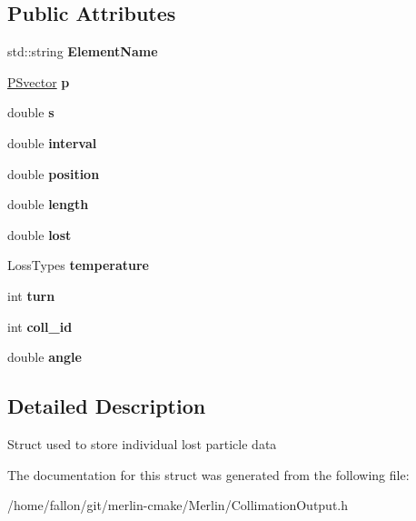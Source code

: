 \subsection*{Public Attributes}
\begin{DoxyCompactItemize}
\item 
\mbox{\label{structParticleTracking_1_1LossData_ae3ef721446c137cf63bd0322235d579b}} 
std\+::string {\bfseries Element\+Name}
\item 
\mbox{\label{structParticleTracking_1_1LossData_a9dc9365025f637a5940b7dc8eac59a1b}} 
\hyperlink{classPSvector}{P\+Svector} {\bfseries p}
\item 
\mbox{\label{structParticleTracking_1_1LossData_a33992b25ed25caf9603245f5e80e6a53}} 
double {\bfseries s}
\item 
\mbox{\label{structParticleTracking_1_1LossData_afe6ed783ff688aaa3b9bfc830f59a958}} 
double {\bfseries interval}
\item 
\mbox{\label{structParticleTracking_1_1LossData_ab2e752654bf9aba6f1be719c4d820b50}} 
double {\bfseries position}
\item 
\mbox{\label{structParticleTracking_1_1LossData_af76edb987b4534e0bec81ff0349e3bc9}} 
double {\bfseries length}
\item 
\mbox{\label{structParticleTracking_1_1LossData_adb6bb51ebf825400bd085f3011e31359}} 
double {\bfseries lost}
\item 
\mbox{\label{structParticleTracking_1_1LossData_ad44c84db3996fda46d4becee3961f389}} 
Loss\+Types {\bfseries temperature}
\item 
\mbox{\label{structParticleTracking_1_1LossData_a591eb4d416b30cef42f149a228d2ebdf}} 
int {\bfseries turn}
\item 
\mbox{\label{structParticleTracking_1_1LossData_a709b1e6fae778f2ebd1c5c73e460b8c7}} 
int {\bfseries coll\+\_\+id}
\item 
\mbox{\label{structParticleTracking_1_1LossData_a32ac4288f18db8099d2ca3694391e72c}} 
double {\bfseries angle}
\end{DoxyCompactItemize}


\subsection{Detailed Description}
Struct used to store individual lost particle data 

The documentation for this struct was generated from the following file\+:\begin{DoxyCompactItemize}
\item 
/home/fallon/git/merlin-\/cmake/\+Merlin/Collimation\+Output.\+h\end{DoxyCompactItemize}
